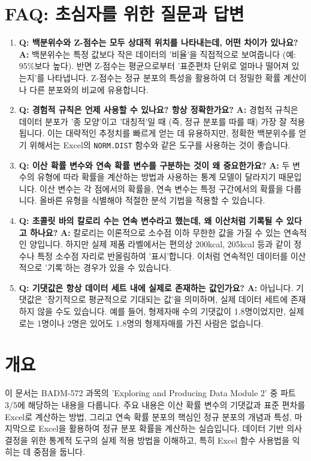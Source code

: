 \documentclass[11pt,a4paper]{book}
\theoremstyle{definition}
\begin{document}
\section{FAQ: 초심자를 위한 질문과 답변}

\begin{enumerate}
    \item \textbf{Q: 백분위수와 Z-점수는 모두 상대적 위치를 나타내는데, 어떤 차이가 있나요?}
    \textbf{A:} 백분위수는 특정 값보다 작은 데이터의 '비율'을 직접적으로 보여줍니다 (예: 95\%보다 높다). 반면 Z-점수는 평균으로부터 '표준편차 단위로 얼마나 떨어져 있는지'를 나타냅니다. Z-점수는 정규 분포의 특성을 활용하여 더 정밀한 확률 계산이나 다른 분포와의 비교에 유용합니다.

    \item \textbf{Q: 경험적 규칙은 언제 사용할 수 있나요? 항상 정확한가요?}
    \textbf{A:} 경험적 규칙은 데이터 분포가 '종 모양'이고 '대칭적'일 때 (즉, 정규 분포를 따를 때) 가장 잘 적용됩니다. 이는 대략적인 추정치를 빠르게 얻는 데 유용하지만, 정확한 백분위수를 얻기 위해서는 Excel의 \texttt{NORM.DIST} 함수와 같은 도구를 사용하는 것이 좋습니다.

    \item \textbf{Q: 이산 확률 변수와 연속 확률 변수를 구분하는 것이 왜 중요한가요?}
    \textbf{A:} 두 변수의 유형에 따라 확률을 계산하는 방법과 사용하는 통계 모델이 달라지기 때문입니다. 이산 변수는 각 점에서의 확률을, 연속 변수는 특정 구간에서의 확률을 다룹니다. 올바른 유형을 식별해야 적절한 분석 기법을 적용할 수 있습니다.

    \item \textbf{Q: 초콜릿 바의 칼로리 수는 연속 변수라고 했는데, 왜 이산처럼 기록될 수 있다고 하나요?}
    \textbf{A:} 칼로리는 이론적으로 소수점 이하 무한한 값을 가질 수 있는 연속적인 양입니다. 하지만 실제 제품 라벨에서는 편의상 200kcal, 205kcal 등과 같이 정수나 특정 소수점 자리로 반올림하여 '표시'합니다. 이처럼 연속적인 데이터를 이산적으로 '기록'하는 경우가 있을 수 있습니다.

    \item \textbf{Q: 기댓값은 항상 데이터 세트 내에 실제로 존재하는 값인가요?}
    \textbf{A:} 아닙니다. 기댓값은 '장기적으로 평균적으로 기대되는 값'을 의미하며, 실제 데이터 세트에 존재하지 않을 수도 있습니다. 예를 들어, 형제자매 수의 기댓값이 1.8명이었지만, 실제로는 1명이나 2명은 있어도 1.8명의 형제자매를 가진 사람은 없습니다.
\end{enumerate}


\section{개요}
이 문서는 BADM-572 과목의 'Exploring and Producing Data Module 2' 중 파트 3/5에 해당하는 내용을 다룹니다.
주요 내용은 이산 확률 변수의 기댓값과 표준 편차를 Excel로 계산하는 방법, 그리고 연속 확률 분포의 핵심인 정규 분포의 개념과 특성, 마지막으로 Excel을 활용하여 정규 분포 확률을 계산하는 실습입니다.
데이터 기반 의사 결정을 위한 통계적 도구의 실제 적용 방법을 이해하고, 특히 Excel 함수 사용법을 익히는 데 중점을 둡니다.
\end{document}
